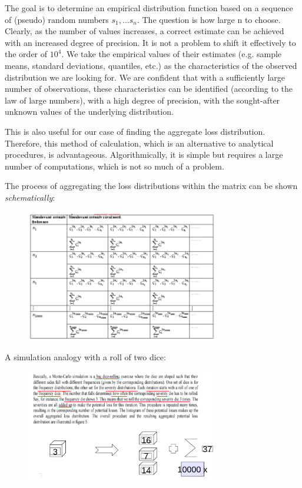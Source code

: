 \documentclass{article}
\begin{document}
The goal is to determine an empirical distribution function based on a sequence of (pseudo) random numbers $s_1, \ldots s_n$. The question is how large n to choose. Clearly, as the number of values increases, a correct estimate can be achieved with an increased degree of precision.  It is not a problem to shift it effectively to the order of $10^4$. We take the empirical values of their estimates (e.g. sample means, standard deviations, quantiles, etc.) as the characteristics of the observed distribution we are looking for. We are confident that with a sufficiently large number of observations, these characteristics can be identified (according to the law of large numbers), with a high degree of precision, with the sought-after unknown values of the underlying distribution.

This is also useful for our case of finding the aggregate loss distribution. Therefore, this method of calculation, which is an alternative to analytical procedures, is advantageous. Algorithmically, it is simple but requires a large number of computations, which is not so much of a problem.

The process of aggregating the loss distributions within the matrix can be shown \emph{schematically}:

\begin{figure}[H]
  \caption{}
  \centering
    \includegraphics[width=0.75\textwidth]{simul_scenare}
\end{figure}


A simulation analogy with a roll of two dice:

\begin{figure}[H]
  \caption{}
  \centering
    \includegraphics[width=0.75\textwidth]{kostky}
\end{figure}
\end{document}
